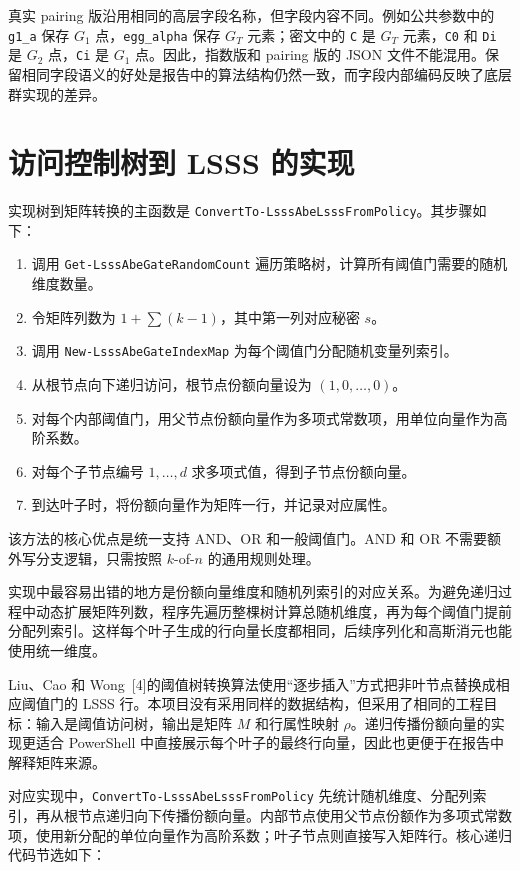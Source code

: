 真实 pairing 版沿用相同的高层字段名称，但字段内容不同。例如公共参数中的 \verb|g1_a| 保存 $G_1$ 点，\verb|egg_alpha| 保存 $G_T$ 元素；密文中的 \verb|C| 是 $G_T$ 元素，\verb|C0| 和 \verb|Di| 是 $G_2$ 点，\verb|Ci| 是 $G_1$ 点。因此，指数版和 pairing 版的 JSON 文件不能混用。保留相同字段语义的好处是报告中的算法结构仍然一致，而字段内部编码反映了底层群实现的差异。

\section{访问控制树到 LSSS 的实现}

实现树到矩阵转换的主函数是 \verb|ConvertTo-LsssAbeLsssFromPolicy|。其步骤如下：

\begin{enumerate}
    \item 调用 \verb|Get-LsssAbeGateRandomCount| 遍历策略树，计算所有阈值门需要的随机维度数量。
    \item 令矩阵列数为 $1+\sum(k-1)$，其中第一列对应秘密 $s$。
    \item 调用 \verb|New-LsssAbeGateIndexMap| 为每个阈值门分配随机变量列索引。
    \item 从根节点向下递归访问，根节点份额向量设为 $(1,0,\dots,0)$。
    \item 对每个内部阈值门，用父节点份额向量作为多项式常数项，用单位向量作为高阶系数。
    \item 对每个子节点编号 $1,\dots,d$ 求多项式值，得到子节点份额向量。
    \item 到达叶子时，将份额向量作为矩阵一行，并记录对应属性。
\end{enumerate}

该方法的核心优点是统一支持 AND、OR 和一般阈值门。AND 和 OR 不需要额外写分支逻辑，只需按照 $k$-of-$n$ 的通用规则处理。

实现中最容易出错的地方是份额向量维度和随机列索引的对应关系。为避免递归过程中动态扩展矩阵列数，程序先遍历整棵树计算总随机维度，再为每个阈值门提前分配列索引。这样每个叶子生成的行向量长度都相同，后续序列化和高斯消元也能使用统一维度。

Liu、Cao 和 Wong~[4]的阈值树转换算法使用“逐步插入”方式把非叶节点替换成相应阈值门的 LSSS 行。本项目没有采用同样的数据结构，但采用了相同的工程目标：输入是阈值访问树，输出是矩阵 $M$ 和行属性映射 $\rho$。递归传播份额向量的实现更适合 PowerShell 中直接展示每个叶子的最终行向量，因此也更便于在报告中解释矩阵来源。

对应实现中，\verb|ConvertTo-LsssAbeLsssFromPolicy| 先统计随机维度、分配列索引，再从根节点递归向下传播份额向量。内部节点使用父节点份额作为多项式常数项，使用新分配的单位向量作为高阶系数；叶子节点则直接写入矩阵行。核心递归代码节选如下：

